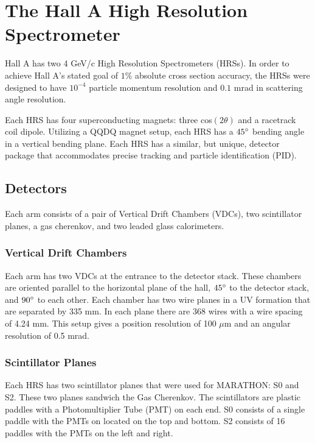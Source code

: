 \section{The Hall A High Resolution Spectrometer}

Hall A has two 4 GeV/c High Resolution Spectrometers (HRSs). In order to achieve Hall A's stated goal of $1\%$ absolute cross section accuracy, the HRSs were designed to have $10^{-4}$ particle momentum resolution and $0.1$ mrad in scattering angle resolution. 

Each HRS has four superconducting magnets: three cos$\left(2\theta\right)$ and a racetrack coil dipole. Utilizing a QQDQ magnet setup, each HRS has a $45\degree$ bending angle in a vertical bending plane. Each HRS has a similar, but unique, detector package that accommodates precise tracking and particle identification (PID).

\subsection{Detectors}

Each arm consists of a pair of Vertical Drift Chambers (VDCs), two scintillator planes, a gas cherenkov, and two leaded glass calorimeters.

\subsubsection{Vertical Drift Chambers}

Each arm has two VDCs at the entrance to the detector stack. These chambers are oriented parallel to the horizontal plane of the hall, $45\degree$ to the detector stack, and $90\degree$ to each other. Each chamber has two wire planes in a UV formation that are separated by 335 mm. In each plane there are 368 wires with a wire spacing of 4.24 mm. This setup gives a position resolution of 100 $\mu$m and an angular resolution of 0.5 mrad.

\subsubsection{Scintillator Planes}

Each HRS has two scintillator planes that were used for MARATHON: S0 and S2. These two planes sandwich the Gas Cherenkov. The scintillators are plastic paddles with a Photomultiplier Tube (PMT) on each end. S0 consists of a single paddle with the PMTs on located on the top and bottom. S2 consists of 16 paddles with the PMTs on the left and right.

